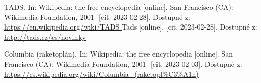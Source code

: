 \documentclass[main.tex]{subfiles}
\begin{document}
\begin{thebibliography}{99}
 TADS. In: Wikipedia: the free encyclopedia [online]. San Francisco (CA): Wikimedia Foundation, 2001- [cit. 2023-02-28]. Dostupné z: \url{ https://en.wikipedia.org/wiki/TADS }
 Tads [online]. [cit. 2023-02-28]. Dostupné z: \url{http://tads.cz/cs/novinky}
 

 Columbia (raketoplán). In: Wikipedia: the free encyclopedia [online]. San Francisco (CA): Wikimedia Foundation, 2001- [cit. 2023-02-03]. Dostupné z: \url{https://cs.wikipedia.org/wiki/Columbia\_(raketopl\%C3\%A1n) }

\end{thebibliography}
\end{document}
